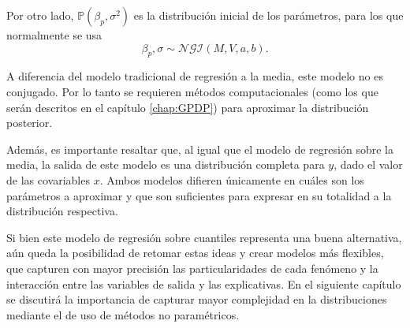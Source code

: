 Por otro lado, $\mathbb{P}(\beta_p,\sigma^2)$ es la distribuci\'on inicial de los par\'ametros, para los que normalmente se usa
\begin{equation*}
    \beta_p,\sigma \sim \mathcal{NGI}(M,V,a,b). 
\end{equation*}

A diferencia del modelo tradicional de regresi\'on a la media, este modelo no es conjugado. Por lo tanto se requieren m\'etodos computacionales (como los que ser\'an descritos en el cap\'itulo \ref{chap:GPDP}) para aproximar la distribuci\'on posterior.

Adem\'as, es importante resaltar que, al igual que el modelo de regresi\'on sobre la media, la salida de este modelo es una distribuci\'on completa para $y$, dado el valor de las covariables $x$. Ambos modelos difieren \'unicamente en cu\'ales son los par\'ametros a aproximar y que son suficientes para expresar en su totalidad a la distribuci\'on respectiva.

Si bien este modelo de regresi\'on sobre cuantiles representa una buena alternativa, a\'un queda la posibilidad de retomar estas ideas y crear modelos m\'as flexibles, que capturen con mayor precisi\'on las particularidades de cada fen\'omeno y la interacci\'on entre las variables de salida y las explicativas. En el siguiente cap\'itulo se discutir\'a la importancia de capturar mayor complejidad en la distribuciones mediante el de uso de m\'etodos no param\'etricos.